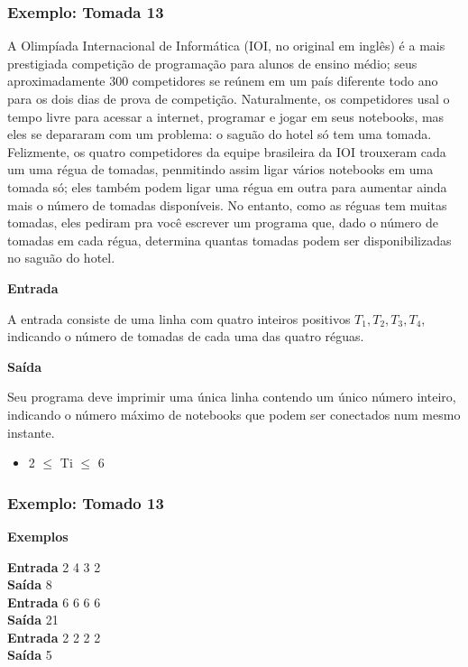 \begin{frame}
  \frametitle{Exemplo: Tomada 13}
  \scriptsize A Olimpíada Internacional de Informática (IOI, no original em inglês) é a mais prestigiada competição de programação para alunos de ensino médio; seus aproximadamente 300 competidores se reúnem em um país diferente todo ano para os dois dias de prova de competição. Naturalmente, os competidores usal o tempo livre para  acessar a internet, programar e jogar em seus notebooks, mas eles se depararam com um problema: o saguão do hotel só tem uma tomada.\\
  \scriptsize Felizmente, os quatro competidores da equipe brasileira da IOI trouxeram cada um uma régua de tomadas, penmitindo assim ligar vários notebooks em uma tomada só; eles também podem ligar uma régua em outra para aumentar ainda mais o número de tomadas disponíveis. No entanto, como as réguas tem muitas tomadas, eles pediram pra você escrever um programa que, dado o número de tomadas em cada régua, determina quantas tomadas podem ser disponibilizadas no saguão do hotel.\\
  \begin{center}
    \textbf{Entrada}
  \end{center}
  \scriptsize A entrada consiste de uma linha com quatro inteiros positivos \begin{math}T_1, T_2, T_3, T_4\end{math}, indicando o número de tomadas de cada uma das quatro réguas.
  \begin{center}
    \textbf{Saída}
  \end{center}
  \scriptsize Seu programa deve imprimir uma única linha contendo um único número inteiro, indicando o número máximo de notebooks que podem ser conectados num mesmo instante.
  \begin{itemize}
    \item 2 $\leq$ Ti $\leq$ 6
  \end{itemize}
\end{frame}

\begin{frame}
  \frametitle{Exemplo: Tomado 13}
  \begin{center}
    \textbf{Exemplos}
  \end{center}
  \textbf{Entrada}
    2	4	3	2\\
  \textbf{Saída}
    8\\
  \textbf{Entrada}
    6	6	6	6\\
  \textbf{Saída}
    21\\
  \textbf{Entrada}
    2	2	2	2\\
  \textbf{Saída}
    5
\end{frame}